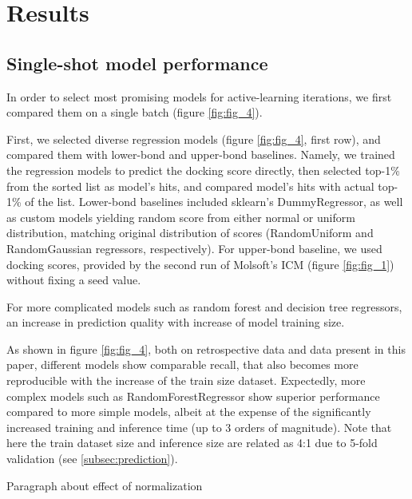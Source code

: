 \section{Results}

\subsection{Single-shot model performance}

In order to select most promising models for active-learning iterations, we first compared them on a single batch (figure \ref{fig:fig_4}). 

First, we selected diverse regression models (figure \ref{fig:fig_4}, first row), and compared them with lower-bond and upper-bond baselines. Namely, we trained the regression models to predict the docking score directly, then selected top-1\% from the sorted list as model's hits, and compared model's hits with actual top-1\% of the list. Lower-bond baselines included sklearn's DummyRegressor, as well as custom models yielding random score from either normal or uniform distribution, matching original distribution of scores (RandomUniform and RandomGaussian regressors, respectively). For upper-bond baseline, we used docking scores, provided by the second run of Molsoft's ICM (figure \ref{fig:fig_1}) without fixing a seed value.

For more complicated models such as random forest and decision tree regressors, an increase in prediction quality with increase of model training size. 

As shown in figure \ref{fig:fig_4}, both on retrospective data \cite{ultralarge_docking_first} and data present in this paper, different models show comparable recall, that also becomes more reproducible with the increase of the train size dataset. Expectedly, more complex models such as RandomForestRegressor show superior performance compared to more simple models, albeit at the expense of the significantly increased training and inference time (up to 3 orders of magnitude). Note that here the train dataset size and inference size are related as 4:1 due to 5-fold validation (see \ref{subsec:prediction}). 

Paragraph about effect of normalization

